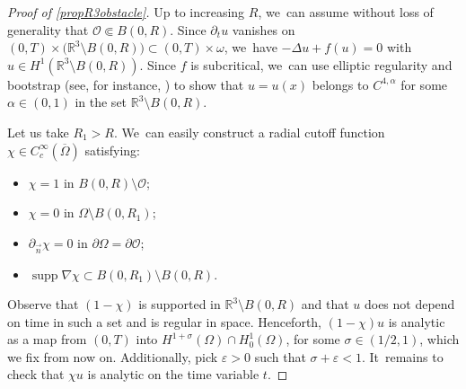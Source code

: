 \documentclass[JEP,XML,SOM,Unicode,published]{cedram}
\DeclareMathOperator{\supp}{\mathrm{supp}}
\theoremstyle{definition}
\let\mc\mathcal
\let\al\alpha
\let\veps\varepsilon
\renewcommand{\O}{\mc{O}}
\newcommand{\R}{\mathbb{R}}
\begin{document}
\begin{proof}[Proof of \cref{propR3obstacle}] Up to increasing $R$, we~can assume without loss of generality that $\O\Subset B(0,R)$. Since $\partial_t u$ vanishes on $(0, T)\times\big(\R^3\setminus B(0,R)\big)\subset (0, T)\times \omega $, we~have $-\Delta u+f(u)=0$ with $u\in H^1(\R^3\setminus B(0, R))$. Since $f$ is subcritical, we~can use elliptic regularity and bootstrap (see, for instance, \cite[Th.\,9.19]{GT01}) to show that $u=u(x)$ belongs to $C^{4, \al}$ for some $\al\in (0, 1)$ in the set $\R^3\setminus B(0, R)$.

Let us take $R_1>R$. We~can easily construct a radial cutoff function $\chi\in C_c^\infty(\overline{\Omega})$ satisfying:
\begin{itemize}
\item $\chi=1$ in $B(0, R)\setminus \O$;
\item $\chi=0$ in $\Omega\setminus B(0, R_1)$;
\item $\partial_{\vec n}\chi=0$ in $\partial\Omega=\partial\O$;
\item $\supp\nabla\chi\subset B(0, R_1)\setminus B(0, R)$.
\end{itemize}
Observe that $(1-\chi)$ is supported in $\R^3\setminus B(0, R)$ and that $u$ does not depend on time in such a set and is regular in space. Henceforth, $(1-\chi) u$ is analytic as a map from $(0, T)$ into $H^{1+\sigma}(\Omega)\cap H_0^1(\Omega)$, for some $\sigma\in (1/2, 1)$, which we fix from now on. Additionally, pick $\veps>0$ such that $\sigma+\veps<1$. It~remains to check that $\chi u$ is analytic on the time variable $t$.


\end{proof}
\end{document}
